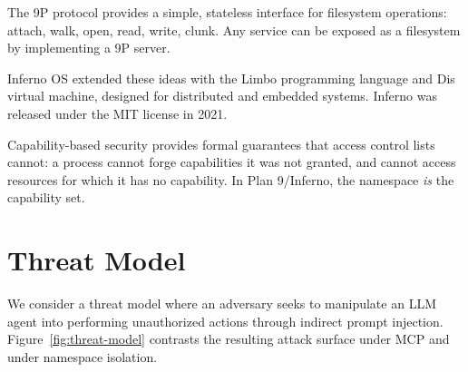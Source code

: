 \documentclass{article}
\begin{document}
The 9P protocol \cite{9p2000} provides a simple, stateless interface for filesystem operations: attach, walk, open, read, write, clunk. Any service can be exposed as a filesystem by implementing a 9P server.

Inferno OS \cite{dorward1997inferno} extended these ideas with the Limbo programming language and Dis virtual machine, designed for distributed and embedded systems. Inferno was released under the MIT license in 2021.

Capability-based security \cite{dennis1966capabilities} provides formal guarantees that access control lists cannot: a process cannot forge capabilities it was not granted, and cannot access resources for which it has no capability. In Plan 9/Inferno, the namespace \textit{is} the capability set.

\section{Threat Model}
\label{sec:threat-model}

We consider a threat model where an adversary seeks to manipulate an LLM agent into performing unauthorized actions through indirect prompt injection. Figure~\ref{fig:threat-model} contrasts the resulting attack surface under MCP and under namespace isolation.
\end{document}
